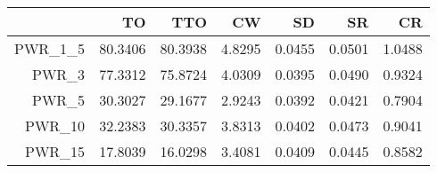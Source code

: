 \begin{tabular}{rrrrrrr}
  \toprule
 & TO & TTO & CW & SD & SR & CR \\ 
  \midrule
PWR\_1\_5 & 80.3406 & 80.3938 & 4.8295 & 0.0455 & 0.0501 & 1.0488 \\ 
  PWR\_3 & 77.3312 & 75.8724 & 4.0309 & 0.0395 & 0.0490 & 0.9324 \\ 
  PWR\_5 & 30.3027 & 29.1677 & 2.9243 & 0.0392 & 0.0421 & 0.7904 \\ 
  PWR\_10 & 32.2383 & 30.3357 & 3.8313 & 0.0402 & 0.0473 & 0.9041 \\ 
  PWR\_15 & 17.8039 & 16.0298 & 3.4081 & 0.0409 & 0.0445 & 0.8582 \\ 
   \bottomrule
\end{tabular}
